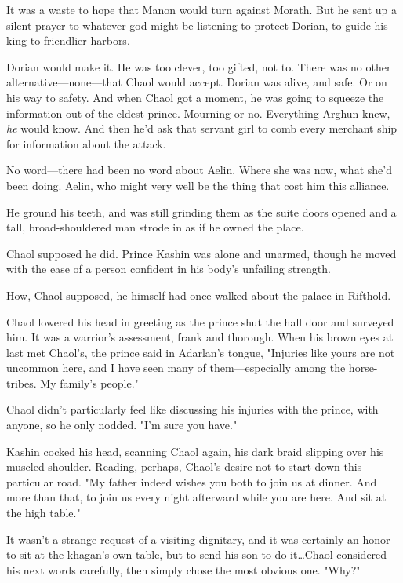 It was a waste to hope that Manon would turn against Morath. But he sent up a silent prayer to whatever god might be listening to protect Dorian, to guide his king to friendlier harbors.

Dorian would make it. He was too clever, too gifted, not to. There was no other alternative---none---that Chaol would accept. Dorian was alive, and safe. Or on his way to safety. And when Chaol got a moment, he was going to squeeze the information out of the eldest prince. Mourning or no. Everything Arghun knew, \emph{he} would know. And then he'd ask that servant girl to comb every merchant ship for information about the attack.

No word---there had been no word about Aelin. Where she was now, what she'd been doing. Aelin, who might very well be the thing that cost him this alliance.

He ground his teeth, and was still grinding them as the suite doors opened and a tall, broad-shouldered man strode in as if he owned the place.

Chaol supposed he did. Prince Kashin was alone and unarmed, though he moved with the ease of a person confident in his body's unfailing strength.

How, Chaol supposed, he himself had once walked about the palace in Rifthold.

Chaol lowered his head in greeting as the prince shut the hall door and surveyed him. It was a warrior's assessment, frank and thorough. When his brown eyes at last met Chaol's, the prince said in Adarlan's tongue, "Injuries like yours are not uncommon here, and I have seen many of them---especially among the horse-tribes. My family's people."

Chaol didn't particularly feel like discussing his injuries with the prince, with anyone, so he only nodded. "I'm sure you have."

Kashin cocked his head, scanning Chaol again, his dark braid slipping over his muscled shoulder. Reading, perhaps, Chaol's desire not to start down this particular road. "My father indeed wishes you both to join us at dinner. And more than that, to join us every night afterward while you are here. And sit at the high table."

It wasn't a strange request of a visiting dignitary, and it was certainly an honor to sit at the khagan's own table, but to send his son to do it\ldots Chaol considered his next words carefully, then simply chose the most obvious one. "Why?"

